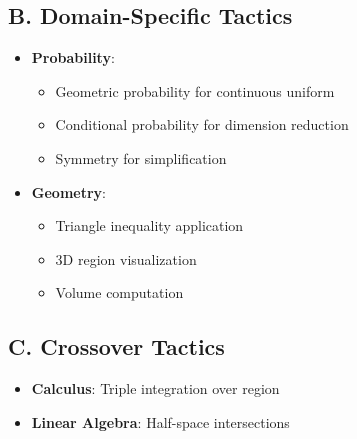 \documentclass[11pt]{article}
\begin{document}
\begin{tacticalbox}
\subsection*{B. Domain-Specific Tactics}
\begin{itemize}[leftmargin=*]
    \item \textbf{Probability}: 
    \begin{itemize}
        \item Geometric probability for continuous uniform
        \item Conditional probability for dimension reduction
        \item Symmetry for simplification
    \end{itemize}
    \item \textbf{Geometry}: 
    \begin{itemize}
        \item Triangle inequality application
        \item 3D region visualization
        \item Volume computation
    \end{itemize}
\end{itemize}

\subsection*{C. Crossover Tactics}
\begin{itemize}[leftmargin=*]
    \item \textbf{Calculus}: Triple integration over region
    \item \textbf{Linear Algebra}: Half-space intersections
\end{itemize}
\end{tacticalbox}
\end{document}
